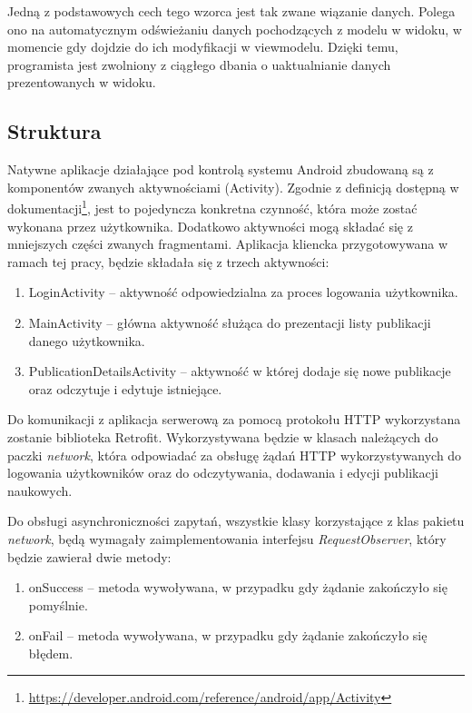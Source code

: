 \documentclass[a4paper,12pt,twoside,openany]{report}
\begin{document}
Jedną z podstawowych cech tego wzorca jest tak zwane wiązanie danych. Polega ono na automatycznym odświeżaniu danych pochodzących z modelu w widoku, w momencie gdy dojdzie do ich modyfikacji w viewmodelu. Dzięki temu, programista jest zwolniony z ciągłego dbania o uaktualnianie danych prezentowanych w widoku.

\newpage
\subsection{Struktura}
Natywne aplikacje działające pod kontrolą systemu Android zbudowaną są z komponentów zwanych aktywnościami (Activity). Zgodnie z definicją dostępną w dokumentacji\footnote{\url{https://developer.android.com/reference/android/app/Activity}}, jest to  pojedyncza konkretna czynność, która może zostać wykonana przez użytkownika. Dodatkowo aktywności mogą składać się z mniejszych części zwanych fragmentami. Aplikacja kliencka przygotowywana w ramach tej pracy, będzie składała się z trzech aktywności:
\begin{enumerate}
	\item LoginActivity -- aktywność odpowiedzialna za proces logowania użytkownika.
	
	\item MainActivity -- główna aktywność służąca do prezentacji listy publikacji danego użytkownika. 

	\item PublicationDetailsActivity -- aktywność w której dodaje się nowe publikacje oraz odczytuje i edytuje istniejące.

\end{enumerate}

Do komunikacji z aplikacja serwerową za pomocą protokołu HTTP wykorzystana zostanie biblioteka Retrofit. Wykorzystywana będzie w klasach należących do paczki \textit{network}, która odpowiadać za obsługę żądań HTTP wykorzystywanych do logowania użytkowników oraz do odczytywania, dodawania i edycji publikacji naukowych. 

Do obsługi asynchroniczności zapytań, wszystkie klasy korzystające z klas pakietu \textit{network}, będą wymagały zaimplementowania interfejsu \textit{RequestObserver}, który będzie zawierał dwie metody:
\begin{enumerate}
	\item onSuccess -- metoda wywoływana, w przypadku gdy żądanie zakończyło się pomyślnie.
	
	\item onFail -- metoda wywoływana, w przypadku gdy żądanie zakończyło się błędem.
\end{enumerate}
\end{document}
